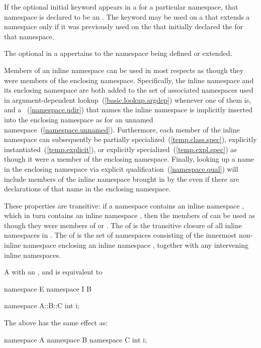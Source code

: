 \pnum
If the optional initial  keyword appears in a
 for a particular namespace, that namespace is
declared to be an . The  keyword may be
used on a  that extends a namespace
only if it was previously used on the  
that initially declared the  for that namespace.

\pnum
The optional 
in a 
appertains to the namespace being defined or extended.

\pnum
Members of an inline namespace can be used in most respects as though they were members
of the enclosing namespace. Specifically, the inline namespace and its enclosing
namespace are both added to the set of associated namespaces used in
argument-dependent lookup~(\ref{basic.lookup.argdep}) whenever one of them is,
and a ~(\ref{namespace.udir}) that names the inline
namespace is implicitly inserted into the enclosing namespace as for an unnamed
namespace~(\ref{namespace.unnamed}). Furthermore, each
member of the inline namespace can subsequently be partially
specialized~(\ref{temp.class.spec}), explicitly
instantiated~(\ref{temp.explicit}), or explicitly specialized~(\ref{temp.expl.spec}) as
though it were a member of the enclosing namespace. Finally, looking up a name in the
enclosing namespace via explicit qualification~(\ref{namespace.qual}) will include
members of the inline namespace brought in by the  even if
there are declarations of that name in the enclosing namespace.

\pnum
These properties are transitive: if a namespace  contains an inline namespace
, which in turn contains an inline namespace , then the members of
 can be used as though they were members of  or .
The  of  is the transitive closure of all
inline namespaces in .
The  of  is the set of namespaces
consisting of the innermost non-inline namespace enclosing
an inline namespace , together with any intervening inline namespaces.

\pnum
A  with an
 ,
  and
 
is equivalent to
\begin{codeblock}
namespace E { namespace I { B } }
\end{codeblock}
\enterexample
\begin{codeblock}
namespace A::B::C {
  int i;
}
\end{codeblock}
The above has the same effect as:
\begin{codeblock}
namespace A {
  namespace B {
    namespace C {
      int i;
    }
  }
}
\end{codeblock}
\exitexample

